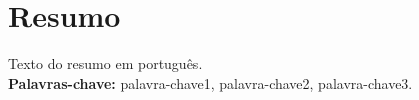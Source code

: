 \newpage
\chapter*{Resumo}
Texto do resumo em português. \\[1em]
\textbf{Palavras-chave:} palavra-chave1, palavra-chave2, palavra-chave3.
\newpage